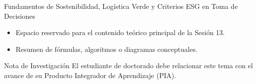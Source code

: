 \documentclass[aspectratio=169, 10pt]{beamer}
\begin{document}
\begin{frame}{Fundamentos de Sostenibilidad, Logística Verde y Criterios ESG en Toma de Decisiones}
    \begin{itemize}
        \item Espacio reservado para el contenido teórico principal de la Sesión 13.
        \item Resumen de fórmulas, algoritmos o diagramas conceptuales.
    \end{itemize}
    \begin{block}{Nota de Investigación}
        El estudiante de doctorado debe relacionar este tema con el avance de su Producto Integrador de Aprendizaje (PIA).
    \end{block}
\end{frame}
\end{document}
